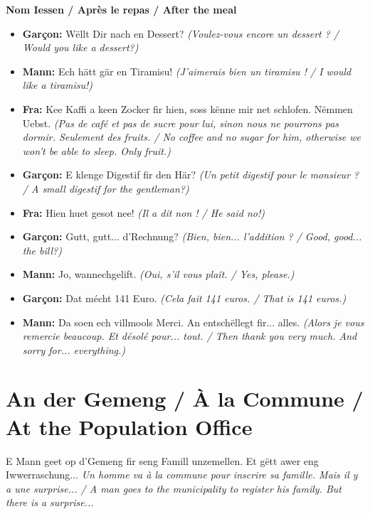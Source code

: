 \vspace{0.5em}
\textbf{Nom Iessen / Après le repas / After the meal}
\vspace{0.5em}

\begin{itemize}
    \item \textbf{Garçon:} Wëllt Dir nach en Dessert? \textit{(Voulez-vous encore un dessert ? / Would you like a dessert?)}
    \item \textbf{Mann:} Ech hätt gär en Tiramisu! \textit{(J'aimerais bien un tiramisu ! / I would like a tiramisu!)}
    \item \textbf{Fra:} Kee Kaffi a keen Zocker fir hien, soss kënne mir net schlofen. Nëmmen Uebst. \textit{(Pas de café et pas de sucre pour lui, sinon nous ne pourrons pas dormir. Seulement des fruits. / No coffee and no sugar for him, otherwise we won't be able to sleep. Only fruit.)}
    \item \textbf{Garçon:} E klenge Digestif fir den Här? \textit{(Un petit digestif pour le monsieur ? / A small digestif for the gentleman?)}
    \item \textbf{Fra:} Hien huet gesot nee! \textit{(Il a dit non ! / He said no!)}
    \item \textbf{Garçon:} Gutt, gutt... d'Rechnung? \textit{(Bien, bien... l'addition ? / Good, good... the bill?)}
    \item \textbf{Mann:} Jo, wannechgelift. \textit{(Oui, s'il vous plaît. / Yes, please.)}
    \item \textbf{Garçon:} Dat mécht 141 Euro. \textit{(Cela fait 141 euros. / That is 141 euros.)}
    \item \textbf{Mann:} Da soen ech villmools Merci. An entschëllegt fir... alles. \textit{(Alors je vous remercie beaucoup. Et désolé pour... tout. / Then thank you very much. And sorry for... everything.)}
\end{itemize}

\vspace{1cm}

\section{An der Gemeng / À la Commune / At the Population Office}

E Mann geet op d'Gemeng fir seng Famill unzemellen. Et gëtt awer eng Iwwerraschung... \textit{Un homme va à la commune pour inscrire sa famille. Mais il y a une surprise... / A man goes to the municipality to register his family. But there is a surprise...}

